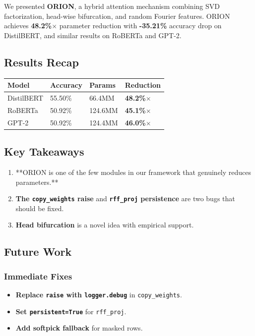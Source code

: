 We presented \textbf{ORION}, a hybrid attention mechanism combining SVD 
factorization, head-wise bifurcation, and random Fourier features. ORION 
achieves \textbf{48.2\%$\times$} parameter reduction with \textbf{-35.21\%} accuracy 
drop on DistilBERT, and similar results on RoBERTa and GPT-2.

\subsection{Results Recap}

\begin{table}[H]
\centering
\small
\begin{tabular}{llll}
\toprule
\textbf{Model} & \textbf{Accuracy} & \textbf{Params} & \textbf{Reduction} \\
\midrule
DistilBERT & 55.50\% & 66.4MM & \textbf{48.2\%$\times$} \\
RoBERTa & 50.92\% & 124.6MM & \textbf{45.1\%$\times$} \\
GPT-2 & 50.92\% & 124.4MM & \textbf{46.0\%$\times$} \\
\bottomrule
\end{tabular}
\end{table}

\subsection{Key Takeaways}

\begin{enumerate}
\item **ORION is one of the few modules in our framework that genuinely
  reduces parameters.**
\item \textbf{The \texttt{copy\_weights} raise} and \textbf{\texttt{rff\_proj} persistence} are two
  bugs that should be fixed.
\item \textbf{Head bifurcation} is a novel idea with empirical support.

\end{enumerate}
\subsection{Future Work}

\subsubsection{Immediate Fixes}

\begin{itemize}
\item \textbf{Replace \texttt{raise} with \texttt{logger.debug}} in \texttt{copy\_weights}.
\item \textbf{Set \texttt{persistent=True}} for \texttt{rff\_proj}.
\item \textbf{Add softpick fallback} for masked rows.

\end{itemize}
